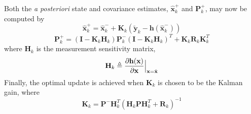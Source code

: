 \documentclass[]{aiaa-tc}%
\begin{document}
Both the \textit{a posteriori} state and covariance estimates, $\hat{\textbf{x}}_k^+$ and $\textbf{P}_k^+$, may now be computed by
%
\begin{equation} \label{eq:xhatplus}
\hat{\textbf{x}}_k^+=\hat{\textbf{x}}_k^-+\textbf{K}_k(\tilde{\textbf{y}}_k-\textbf{h}(\hat{\textbf{x}}_k^-))
\end{equation}
%
\begin{equation} \label{eq:Pplus}
\textbf{P}_k^+=(\textbf{I}-\textbf{K}_k\textbf{H}_k)\textbf{P}_k^-(\textbf{I}-\textbf{K}_k\textbf{H}_k)^T+\textbf{K}_k\textbf{R}_k\textbf{K}_k^T
\end{equation}
%
where $\textbf{H}_k$ is the measurement sensitivity matrix,
%
\begin{equation} \label{eq:Jacobian}
\textbf{H}_k\triangleq\frac{\partial{\textbf{h}(\textbf{x})}}{\partial{\textbf{x}}}\Big{|}_{\textbf{x}=\hat{\textbf{x}}}
\end{equation}
%
Finally, the optimal update is achieved when $\textbf{K}_k$ is chosen to be the Kalman gain, where
%
\begin{equation} \label{eq:K}
\textbf{K}_k=\textbf{P}^-\textbf{H}_k^T(\textbf{H}_k\textbf{P}\textbf{H}_k^T+\textbf{R}_k)^{-1}
\end{equation}
%

\end{document}
